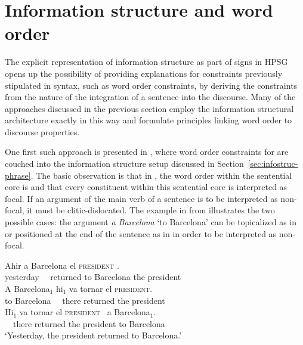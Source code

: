 \documentclass[output=paper
 	        ,biblatex
                ,babelshorthands
                ,newtxmath
                ,draftmode
                ,colorlinks, citecolor=brown
]{langscibook}
\begin{document}
\section{Information structure and word order}
\label{sec:word-order}
The explicit representation of information structure as part of signs
in HPSG opens up the possibility of providing explanations for
constraints previously stipulated in syntax, such as word order
constraints, by deriving the constraints from the nature of the
integration of a sentence into the discourse. Many of the approaches
discussed in the previous section employ the information structural
architecture exactly in this way and formulate principles linking word
order to discourse properties.

One first such approach is presented in \cite{EV96a}, where word order
constraints for  are couched into the information
structure setup discussed in Section~\ref{sec:infostruc-phrase}. The
basic observation is that in , the word order within the
sentential core is  and that every constituent within this
sentential core is interpreted as focal. If an argument of the main
verb of a sentence is to be interpreted as non-focal, it must be
clitic-dislocated. The example in  from \cite{EV96a}
illustrates the two possible cases: the argument \textit{a Barcelona}
`to Barcelona' can be topicalized as in  or positioned at
the end of the sentence as in  in order to be interpreted
as non-focal.

\begin{exe}
  \ex\label{ex:catalan}
  \begin{xlist}
    \ex\gll Ahir  a Barcelona el \textsc{president} \RF.\\
         yesterday \ \ returned to Barcelona the president\\
   \ex\gll  A Barcelona$_1$ \LF hi$_1$ {va tornar} el \textsc{president}\RF.\\
           to Barcelona \ \  there returned the president\\\label{ex:catalan-a}
           \ex\gll \LF Hi$_1$ {va tornar} el \textsc{president}\RF\ {} a Barcelona$_1$.\\
            \ \  there  returned the president to Barcelona\\\label{ex:catalan-b}
\trans `Yesterday, the president returned to Barcelona.'
  \end{xlist}
\end{exe}
 
\end{document}
